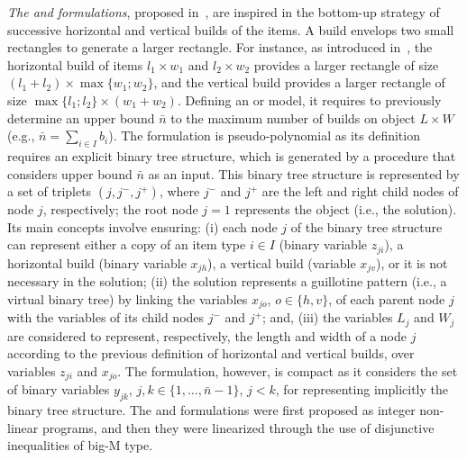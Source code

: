 \emph{The {\modelHierarchical} and {\modelImplicit} formulations}, proposed in~\citet{martin:2020:bottom}, are inspired in the bottom-up strategy of successive horizontal and vertical builds of the items.
A build envelops two small rectangles to generate a larger rectangle.
For instance, as introduced in~\citet{wang:1983}, the horizontal build of items $l_1 \times w_1$ and $l_2 \times w_2$ provides a larger rectangle of size $(l_1+l_2)\times \max\{w_1;w_2\}$, and the vertical build provides a larger rectangle of size $\max\{l_1;l_2\} \times (w_1+w_2)$.
Defining an {\modelHierarchical} or {\modelImplicit} model, it requires to previously determine an upper bound $\bar{n}$ to the maximum number of builds on object $L \times W$ (e.g., $\bar{n}=\sum_{i \in I} b_i$).
The {\modelHierarchical} formulation is pseudo-polynomial as its definition requires an explicit binary tree structure, which is generated by a procedure that considers upper bound $\bar{n}$ as an input.
This binary tree structure is represented by a set of triplets $(j,j^-,j^+)$, where $j^-$ and $j^+$ are the left and right child nodes of node $j$, respectively; the root node $j=1$ represents the object (i.e., the solution).
Its main concepts involve ensuring:
(i) each node $j$ of the binary tree structure can represent either a copy of an item type $i \in I$ (binary variable $z_{ji}$), a horizontal build (binary variable $x_{jh}$), a vertical build (variable $x_{jv}$), or it is not necessary in the solution; 
(ii) the solution represents a guillotine pattern (i.e., a virtual binary tree) by linking the variables $x_{jo}$, $o \in \{h,v\}$, of each parent node $j$ with the variables of its child nodes $j^-$ and $j^+$; and,
(iii) the variables $L_j$ and $W_j$ are considered to represent, respectively, the length and width of a node $j$ according to the previous definition of horizontal and vertical builds, over variables $z_{ji}$ and $x_{jo}$.
The {\modelImplicit} formulation, however, is compact as it considers the set of binary variables $y_{jk}$, $j,k \in \{1,\ldots,\bar{n}-1\}$, $j<k$, for representing implicitly the binary tree structure.
The {\modelHierarchical} and {\modelImplicit} formulations were first proposed as integer non-linear programs, and then they were linearized through the use of disjunctive inequalities of big-M type.

